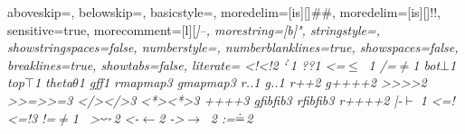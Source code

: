  {
  aboveskip=\smallskipamount,
  belowskip=\smallskipamount,
  basicstyle=\ttfamily\codesize,
  moredelim=[is][\showfocus]{\#}{\#},
  moredelim=[is][\showlogic]{!}{!},
  sensitive=true,
  morecomment=[l][\color{gray_ulisses}\ttfamily\itshape\codesize]{--},
  morestring=[b]",
  stringstyle=\color{haskellstr},
  showstringspaces=false,
  numberstyle=\codesize,
  numberblanklines=true,
  showspaces=false,
  breaklines=true,
  showtabs=false,
  literate={
           {<!}{{{\color{lcolor}<!}}}2
           {`}{{{$^{\backprime}{}$}}}1
           {?}{{{\color{lcolor}?}}}1
           {<=}{{$\leq\;\;$}}1
           {/=}{{$\neq$}}1
           {bot}{{$\bot$}}1
           {top}{{$\top$}}1
           {theta}{{$\theta$}}1
           {gf}{{{\color{lappascolor}f}}}1
           {rmap}{{{\color{lappcolor}map}}}3
           {gmap}{{{\color{lappascolor}map}}}3
           {r.}{{{\color{lappcolor}.}}}1
           {g.}{{{\color{lappascolor}.}}}1
           {r++}{{{\showfocus{++}}}}2
           {g++}{{{\color{lappascolor}++}}}2
           {>>}{{{\color{haskellblue}>>}}}2
           {>>=}{{{\color{haskellblue}>>=}}}3
           {</>}{{{\color{haskellblue}</>}}}3
           {<*>}{{{\color{haskellblue}<*>}}}3
           {++}{{{\color{haskellblue}++}}}3
           {gfib}{{{\color{lappascolor}fib}}}3
           {rfib}{{{\color{lappcolor}fib}}}3
           {r++}{{{\color{lappcolor}++}}}2
           {|-}{{$\vdash\;$}}1
           {<=!}{{{\color{lcolor}<=!}}}3
           {!=}{{$\neq$}}1
           {~>}{{$\rightsquigarrow$}}2
           {<-}{{$\leftarrow$}}2
           {->}{{$\rightarrow\;\;$}}2                    %
           {:=}{{$\doteq$}}2                          %
}}
